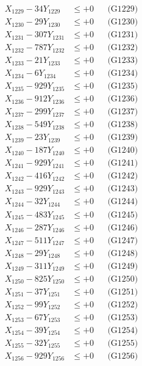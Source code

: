 \documentclass[a4paper,10pt]{article}
\begin{document}
{\begin{align}
X_{1229} - 34Y_{1229} &\leq +0 && \text{(G1229)} \\
X_{1230} - 29Y_{1230} &\leq +0 && \text{(G1230)} \\
\allowbreak
X_{1231} - 307Y_{1231} &\leq +0 && \text{(G1231)} \\
X_{1232} - 787Y_{1232} &\leq +0 && \text{(G1232)} \\
X_{1233} - 21Y_{1233} &\leq +0 && \text{(G1233)} \\
X_{1234} - 6Y_{1234} &\leq +0 && \text{(G1234)} \\
X_{1235} - 929Y_{1235} &\leq +0 && \text{(G1235)} \\
X_{1236} - 912Y_{1236} &\leq +0 && \text{(G1236)} \\
X_{1237} - 299Y_{1237} &\leq +0 && \text{(G1237)} \\
X_{1238} - 549Y_{1238} &\leq +0 && \text{(G1238)} \\
X_{1239} - 23Y_{1239} &\leq +0 && \text{(G1239)} \\
X_{1240} - 187Y_{1240} &\leq +0 && \text{(G1240)} \\
\allowbreak
X_{1241} - 929Y_{1241} &\leq +0 && \text{(G1241)} \\
X_{1242} - 416Y_{1242} &\leq +0 && \text{(G1242)} \\
X_{1243} - 929Y_{1243} &\leq +0 && \text{(G1243)} \\
X_{1244} - 32Y_{1244} &\leq +0 && \text{(G1244)} \\
X_{1245} - 483Y_{1245} &\leq +0 && \text{(G1245)} \\
X_{1246} - 287Y_{1246} &\leq +0 && \text{(G1246)} \\
X_{1247} - 511Y_{1247} &\leq +0 && \text{(G1247)} \\
X_{1248} - 29Y_{1248} &\leq +0 && \text{(G1248)} \\
X_{1249} - 311Y_{1249} &\leq +0 && \text{(G1249)} \\
X_{1250} - 825Y_{1250} &\leq +0 && \text{(G1250)} \\
\allowbreak
X_{1251} - 37Y_{1251} &\leq +0 && \text{(G1251)} \\
X_{1252} - 99Y_{1252} &\leq +0 && \text{(G1252)} \\
X_{1253} - 67Y_{1253} &\leq +0 && \text{(G1253)} \\
X_{1254} - 39Y_{1254} &\leq +0 && \text{(G1254)} \\
X_{1255} - 32Y_{1255} &\leq +0 && \text{(G1255)} \\
X_{1256} - 929Y_{1256} &\leq +0 && \text{(G1256)} \\

\end{align}}
\end{document}
